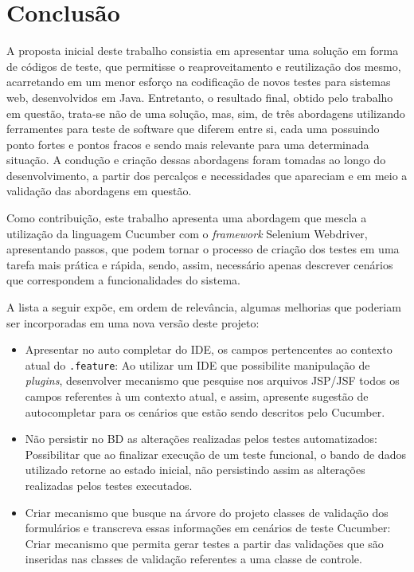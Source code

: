 \documentclass[tg]{mdtufsm}
\begin{document}
\chapter{Conclusão}
A proposta inicial deste trabalho consistia em apresentar uma solução em forma de códigos de teste, que permitisse o reaproveitamento e reutilização dos mesmo, acarretando em um menor esforço na codificação de novos testes para sistemas web, desenvolvidos em Java. Entretanto, o resultado final, obtido pelo trabalho em questão, trata-se não de uma solução, mas, sim, de três abordagens utilizando ferramentes para teste de software que diferem entre si, cada uma possuindo ponto fortes e pontos fracos e sendo mais relevante para uma determinada situação. A condução e criação dessas abordagens foram tomadas ao longo do desenvolvimento, a partir dos percalços e necessidades que apareciam e em meio a validação das abordagens em questão.

Como contribuição, este trabalho apresenta uma abordagem que mescla a utilização da linguagem Cucumber com o \emph{framework} Selenium Webdriver, apresentando passos, que podem tornar o processo de criação dos testes em uma tarefa mais prática e rápida, sendo, assim, necessário apenas descrever cenários que correspondem a funcionalidades do sistema.

A lista a seguir expõe, em ordem de relevância, algumas melhorias que poderiam ser incorporadas em uma nova versão deste projeto:

\begin{itemize}
	\item Apresentar no auto completar do IDE, os campos pertencentes ao contexto atual do \texttt{.feature}: Ao utilizar um IDE que possibilite manipulação de \emph{plugins}, desenvolver mecanismo que pesquise nos arquivos JSP/JSF todos os campos referentes à um contexto atual, e assim, apresente sugestão de autocompletar para os cenários que estão sendo descritos pelo Cucumber.
	\item Não persistir no BD as alterações realizadas pelos testes automatizados: Possibilitar que ao finalizar execução de um teste funcional, o bando de dados utilizado retorne ao estado inicial, não persistindo assim as alterações realizadas pelos testes executados.
	\item Criar mecanismo que busque na árvore do projeto classes de validação dos formulários e transcreva essas informações em cenários de teste Cucumber: Criar mecanismo que permita gerar testes a partir das validações que são inseridas nas classes de validação referentes a uma classe de controle.
\end{itemize}

\setlength{\baselineskip}{\baselineskip}


\end{document}
